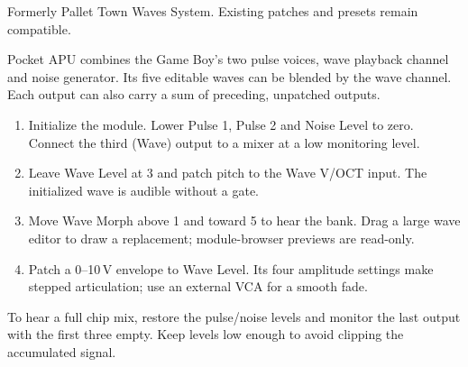 Formerly Pallet Town Waves System. Existing patches and presets remain compatible.

Pocket APU combines the Game Boy's two pulse voices, wave playback channel
and noise generator. Its five editable waves can be blended by the wave
channel. Each output can also carry a sum of preceding, unpatched outputs.

\begin{enumerate}
\item Initialize the module. Lower Pulse 1, Pulse 2 and Noise Level to zero.
Connect the third (Wave) output to a mixer at a low monitoring level.
\item Leave Wave Level at 3 and patch pitch to the Wave V/OCT input. The
initialized wave is audible without a gate.
\item Move Wave Morph above 1 and toward 5 to hear the bank. Drag a large
wave editor to draw a replacement; module-browser previews are read-only.
\item Patch a 0--10\,V envelope to Wave Level. Its four amplitude settings
make stepped articulation; use an external VCA for a smooth fade.
\end{enumerate}

To hear a full chip mix, restore the pulse/noise levels and monitor the last
output with the first three empty. Keep levels low enough to avoid clipping
the accumulated signal.
